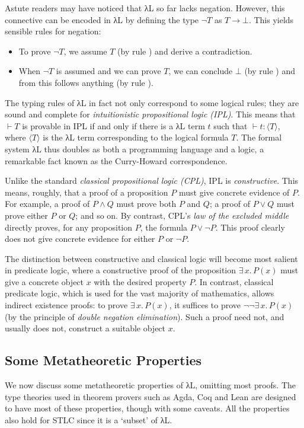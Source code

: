 \documentclass{scrartcl}
\theoremstyle{definition}
\newcommand{\Ex}[2]{∃\,#1.\, #2}
\newcommand{\lbl}[1]{\RightTirNameStyle{#1}}
\begin{document}
Astute readers may have noticed that λL so far lacks negation.
However, this connective can be encoded in λL by defining the type $¬ T$ as $T → ⊥$.
This yields sensible rules for negation:
\begin{itemize}
  \item To prove $¬ T$, we assume $T$ (by rule \lbl{Abs}) and derive a contradiction.
  \item When $¬ T$ is assumed and we can prove $T$, we can conclude $⊥$ (by rule \lbl{App}) and from this follows anything (by rule \lbl{Absurd}).
\end{itemize}

The typing rules of λL in fact not only correspond to some logical rules; they are sound and complete for \emph{intuitionistic propositional logic (IPL)}.
This means that $⊢ T$ is provable in IPL if and only if there is a λL term $t$ such that $⊢ t : ⟨T⟩$, where $⟨T⟩$ is the λL term corresponding to the logical formula $T$.
The formal system λL thus doubles as both a programming language and a logic, a remarkable fact known as the Curry-Howard correspondence.

Unlike the standard \emph{classical propositional logic (CPL)}, IPL is \emph{constructive}.
This means, roughly, that a proof of a proposition $P$ must give concrete evidence of $P$.
For example, a proof of $P ∧ Q$ must prove both $P$ and $Q$; a proof of $P ∨ Q$ must prove either $P$ or $Q$; and so on.
By contrast, CPL's \emph{law of the excluded middle} directly proves, for any proposition $P$, the formula $P ∨ ¬ P$.
This proof clearly does not give concrete evidence for either $P$ or $¬ P$.

The distinction between constructive and classical logic will become most salient in predicate logic, where a constructive proof of the proposition $\Ex{x}{P(x)}$ must give a concrete object $x$ with the desired property $P$.
In contrast, classical predicate logic, which is used for the vast majority of mathematics, allows indirect existence proofs:
to prove $\Ex{x}{P(x)}$, it suffices to prove $¬¬ \Ex{x}{P(x)}$ (by the principle of \emph{double negation elimination}).
Such a proof need not, and usually does not, construct a suitable object $x$.

\subsection{Some Metatheoretic Properties}

We now discuss some metatheoretic properties of λL, omitting most proofs.
The type theories used in theorem provers such as Agda, Coq and Lean are designed to have most of these properties, though with some caveats.
All the properties also hold for STLC since it is a \enquote*{subset} of λL.
\end{document}
